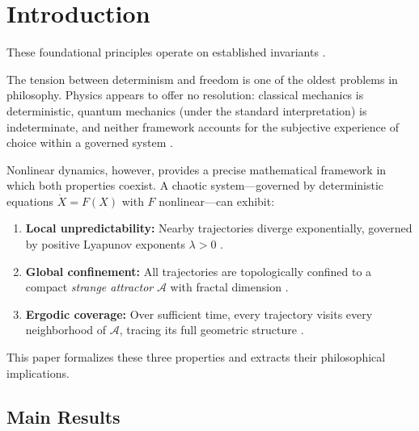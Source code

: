 \documentclass[12pt, a4paper]{article}
\theoremstyle{plain}
\theoremstyle{definition}
\theoremstyle{remark}
\newcommand{\calA}{\mathcal{A}}
\begin{document}
\section{Introduction}
These foundational principles operate on established invariants \cite{strogatz2018nonlinear,lorenz1963deterministic}.\label{sec:intro}

The tension between determinism and freedom is one of the oldest problems
in philosophy. Physics appears to offer no resolution: classical mechanics
is deterministic, quantum mechanics (under the standard interpretation) is
indeterminate, and neither framework accounts for the subjective experience
of choice within a governed system \citep{Kane1998, Dennett2003}.

Nonlinear dynamics, however, provides a precise mathematical framework in
which both properties coexist. A chaotic system---governed by deterministic
equations $\dot{X} = F(X)$ with $F$ nonlinear---can exhibit:

\begin{enumerate}[label=(\roman*)]
  \item \textbf{Local unpredictability:} Nearby trajectories diverge
    exponentially, governed by positive Lyapunov exponents $\lambda > 0$
    \citep{Lorenz1963, Ruelle1971}.
  \item \textbf{Global confinement:} All trajectories are topologically
    confined to a compact \emph{strange attractor} $\calA$ with fractal
    dimension \citep{Grassberger1983}.
  \item \textbf{Ergodic coverage:} Over sufficient time, every trajectory
    visits every neighborhood of $\calA$, tracing its full geometric
    structure \citep{Sinai1970}.
\end{enumerate}

This paper formalizes these three properties and extracts their
philosophical implications.

\subsection{Main Results}
\end{document}
